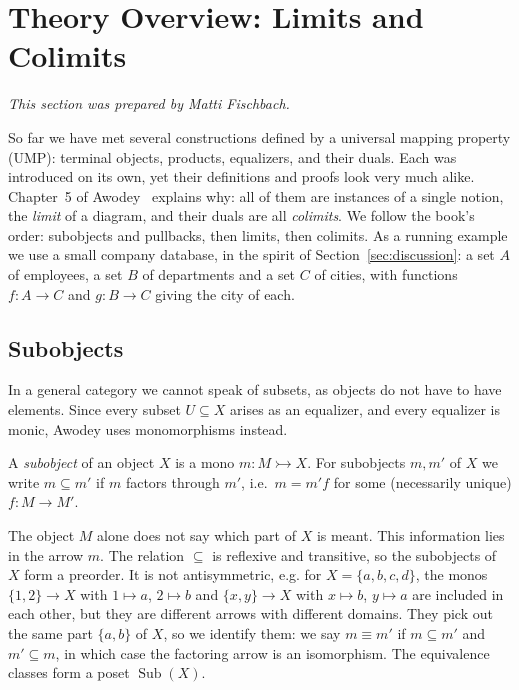 \providecommand{\Sub}{\operatorname{Sub}}
\providecommand{\Hom}{\operatorname{Hom}}
\providecommand{\colim}{\operatorname*{colim}}
\providecommand{\mono}{\rightarrowtail}

\section{Theory Overview: Limits and Colimits}
\label{sec:theory}

\emph{This section was prepared by Matti Fischbach.}

So far we have met several constructions defined by a universal mapping
property (UMP): terminal objects, products, equalizers, and their duals. Each
was introduced on its own, yet their definitions and proofs look very much
alike. Chapter~5 of Awodey~\cite{Awodey10} explains why: all of them are
instances of a single notion, the \emph{limit} of a diagram, and their duals
are all \emph{colimits}. We follow the book's order: subobjects and
pullbacks, then limits, then colimits. As a running example we use a small
company database, in the spirit of Section~\ref{sec:discussion}: a set $A$ of
employees, a set $B$ of departments and a set $C$ of cities, with functions
$f: A \to C$ and $g: B \to C$ giving the city of each.

\subsection{Subobjects}
\label{sec:subobjects}

In a general category we cannot speak of subsets, as objects do not have to
have elements. Since every subset $U \subseteq X$ arises as an equalizer, and
every equalizer is monic, Awodey uses monomorphisms instead.

\begin{definition}[Subobject]
  A \emph{subobject} of an object $X$ is a mono $m: M \mono X$. For subobjects
  $m, m'$ of $X$ we write $m \subseteq m'$ if $m$ factors through $m'$, i.e.\
  $m = m' f$ for some (necessarily unique) $f: M \to M'$.
\end{definition}

The object $M$ alone does not say which part of $X$ is meant. This
information lies in the arrow $m$. The relation $\subseteq$ is reflexive and
transitive, so the subobjects of $X$ form a preorder. It is not antisymmetric,
e.g. for $X = \{a, b, c, d\}$, the monos $\{1, 2\} \to X$ with $1 \mapsto a$,
$2 \mapsto b$ and $\{x, y\} \to X$ with $x \mapsto b$, $y \mapsto a$ are
included in each other, but they are different arrows with different domains.
They pick out the same part $\{a, b\}$ of $X$, so we identify them: we say $m
\equiv m'$ if $m \subseteq m'$ and $m' \subseteq m$, in which case the
factoring arrow is an isomorphism. The equivalence classes form a poset
$\Sub(X)$.

